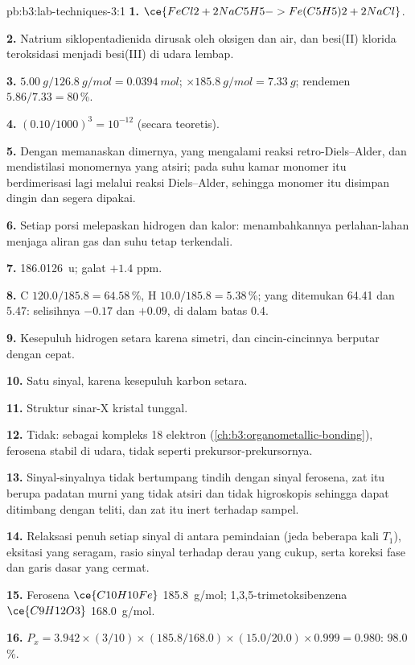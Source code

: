 \begin{solution}{pb:b3:lab-techniques-3:1}
\textbf{1.} $\ce{FeCl2 + 2NaC5H5 -> Fe(C5H5)2 + 2NaCl}$.

\textbf{2.} Natrium siklopentadienida dirusak oleh oksigen dan air, dan besi(II)
klorida teroksidasi menjadi besi(III) di udara lembap.

\textbf{3.} $\qty{5.00}{g}/\qty{126.8}{g/mol} = \qty{0.0394}{mol}$; $\times \qty{185.8}{g/mol} = \qty{7.33}{g}$; rendemen $5.86/7.33 = 80$\,\%.

\textbf{4.} $(0.10/1000)^3 = 10^{-12}$ (secara teoretis).

\textbf{5.} Dengan memanaskan dimernya, yang mengalami reaksi retro-Diels--Alder, dan
mendistilasi monomernya yang atsiri; pada suhu kamar monomer itu berdimerisasi
lagi melalui reaksi Diels--Alder, sehingga monomer itu disimpan dingin dan segera dipakai.

\textbf{6.} Setiap porsi melepaskan hidrogen dan kalor: menambahkannya perlahan-lahan menjaga aliran gas
dan suhu tetap terkendali.

\textbf{7.} \qty{186.0126}{u}; galat $+1.4$ ppm.

\textbf{8.} C $120.0/185.8 = 64.58$\,\%, H $10.0/185.8 = 5.38$\,\%; yang ditemukan 64.41 dan 5.47: selisihnya $-0.17$ dan $+0.09$, di dalam batas 0.4.

\textbf{9.} Kesepuluh hidrogen setara karena simetri, dan cincin-cincinnya berputar dengan cepat.

\textbf{10.} Satu sinyal, karena kesepuluh karbon setara.

\textbf{11.} Struktur sinar-X kristal tunggal.

\textbf{12.} Tidak: sebagai kompleks 18 elektron (\cref{ch:b3:organometallic-bonding}), ferosena stabil di udara, tidak seperti
prekursor-prekursornya.

\textbf{13.} Sinyal-sinyalnya tidak bertumpang tindih dengan sinyal ferosena, zat itu berupa padatan murni yang tidak atsiri dan
tidak higroskopis sehingga dapat ditimbang dengan teliti, dan zat itu inert terhadap
sampel.

\textbf{14.} Relaksasi penuh setiap sinyal di antara pemindaian (jeda beberapa kali $T_1$),
eksitasi yang seragam, rasio sinyal terhadap derau yang cukup, serta koreksi fase dan garis dasar
yang cermat.

\textbf{15.} Ferosena $\ce{C10H10Fe}$ \qty{185.8}{g/mol}; 1,3,5-trimetoksibenzena $\ce{C9H12O3}$ \qty{168.0}{g/mol}.

\textbf{16.} $P_x = 3.942 \times (3/10) \times (185.8/168.0) \times (15.0/20.0) \times 0.999 = 0.980$: 98.0\,\%.


\end{solution}
